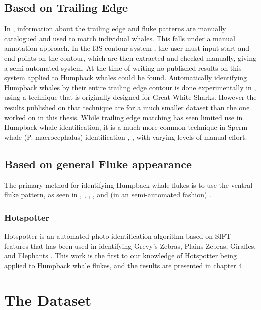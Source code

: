 \subsection{Based on Trailing Edge}

In \cite{mizroch1990computer}, information about the trailing edge and fluke patterns are manually catalogued and used to match individual whales. This falls under a manual annotation approach.
In the I3S contour system \cite{i3scontour}, the user must input start and end points on the contour, which are then extracted and checked manually, giving a semi-automated system. 
At the time of writing no published results on this system applied to Humpback whales could be found.
Automatically identifying Humpback whales by their entire trailing edge contour is done experimentally in \cite{hughes2015automated}, using a technique that is originally designed for Great White Sharks. 
However the results published on that technique are for a much smaller dataset than the one worked on in this thesis.
While trailing edge matching has seen limited use in Humpback whale identification, it is a much more common technique in Sperm whale (P. macrocephalus) identification \cite{huele2000finding}, \cite{beekmans2005comparison} \cite{whitehead1990computer}, with varying levels of manual effort.

\subsection{Based on general Fluke appearance}

The primary method for identifying Humpback whale flukes is to use the ventral fluke pattern, as seen in \cite{mizroch1990computer}, \cite{carlson1990changes}, \cite{blackmer2000temporal}, \cite{friday2000measurement}, and (in an semi-automated fashion) \cite{kniest2010fluke}. 

\subsubsection{Hotspotter}

Hotspotter \cite{crall_hotspotter_2013} is an automated photo-identification algorithm based on SIFT features that has been used in identifying Grevy's Zebras, Plains Zebras, Giraffes, and Elephants \cite{parham2015photographic}. This work is the first to our knowledge of Hotspotter being applied to Humpback whale flukes, and the results are presented in chapter 4.

\section{The Dataset}

